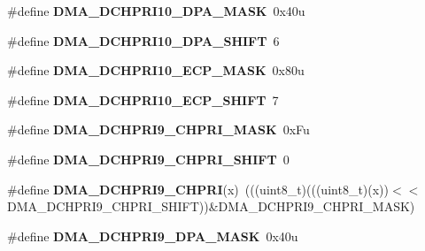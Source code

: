 \begin{DoxyCompactItemize}
\item 
\#define {\bfseries D\+M\+A\+\_\+\+D\+C\+H\+P\+R\+I10\+\_\+\+D\+P\+A\+\_\+\+M\+A\+SK}~0x40u\hypertarget{group__DMA__Register__Masks_gaf20edd13f4d37134819d152681b34b4e}{}\label{group__DMA__Register__Masks_gaf20edd13f4d37134819d152681b34b4e}

\item 
\#define {\bfseries D\+M\+A\+\_\+\+D\+C\+H\+P\+R\+I10\+\_\+\+D\+P\+A\+\_\+\+S\+H\+I\+FT}~6\hypertarget{group__DMA__Register__Masks_ga81809b2ae57f16cec20cb50f1a4a8b1e}{}\label{group__DMA__Register__Masks_ga81809b2ae57f16cec20cb50f1a4a8b1e}

\item 
\#define {\bfseries D\+M\+A\+\_\+\+D\+C\+H\+P\+R\+I10\+\_\+\+E\+C\+P\+\_\+\+M\+A\+SK}~0x80u\hypertarget{group__DMA__Register__Masks_ga7a9d675356e6d5951279c4781bb5a1c7}{}\label{group__DMA__Register__Masks_ga7a9d675356e6d5951279c4781bb5a1c7}

\item 
\#define {\bfseries D\+M\+A\+\_\+\+D\+C\+H\+P\+R\+I10\+\_\+\+E\+C\+P\+\_\+\+S\+H\+I\+FT}~7\hypertarget{group__DMA__Register__Masks_ga9d6bb10c4809a0eb5120c5e7cdf6adfc}{}\label{group__DMA__Register__Masks_ga9d6bb10c4809a0eb5120c5e7cdf6adfc}

\item 
\#define {\bfseries D\+M\+A\+\_\+\+D\+C\+H\+P\+R\+I9\+\_\+\+C\+H\+P\+R\+I\+\_\+\+M\+A\+SK}~0x\+Fu\hypertarget{group__DMA__Register__Masks_gac782f5e68a3eef4653396b11311fc41b}{}\label{group__DMA__Register__Masks_gac782f5e68a3eef4653396b11311fc41b}

\item 
\#define {\bfseries D\+M\+A\+\_\+\+D\+C\+H\+P\+R\+I9\+\_\+\+C\+H\+P\+R\+I\+\_\+\+S\+H\+I\+FT}~0\hypertarget{group__DMA__Register__Masks_ga673fcc8804637150719453e55168fc66}{}\label{group__DMA__Register__Masks_ga673fcc8804637150719453e55168fc66}

\item 
\#define {\bfseries D\+M\+A\+\_\+\+D\+C\+H\+P\+R\+I9\+\_\+\+C\+H\+P\+RI}(x)~(((uint8\+\_\+t)(((uint8\+\_\+t)(x))$<$$<$D\+M\+A\+\_\+\+D\+C\+H\+P\+R\+I9\+\_\+\+C\+H\+P\+R\+I\+\_\+\+S\+H\+I\+FT))\&D\+M\+A\+\_\+\+D\+C\+H\+P\+R\+I9\+\_\+\+C\+H\+P\+R\+I\+\_\+\+M\+A\+SK)\hypertarget{group__DMA__Register__Masks_ga891fccde7e5bc5c0708b5f06996a7814}{}\label{group__DMA__Register__Masks_ga891fccde7e5bc5c0708b5f06996a7814}

\item 
\#define {\bfseries D\+M\+A\+\_\+\+D\+C\+H\+P\+R\+I9\+\_\+\+D\+P\+A\+\_\+\+M\+A\+SK}~0x40u\hypertarget{group__DMA__Register__Masks_gaf6b71f66ce2e3113012b094e339c2c97}{}\label{group__DMA__Register__Masks_gaf6b71f66ce2e3113012b094e339c2c97}


\end{DoxyCompactItemize}
